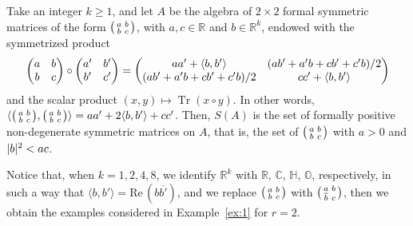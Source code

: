 \documentclass[10.5pt,reqno]{amsart}
\DeclareMathOperator{\tr}{Tr}
\DeclarePairedDelimiter{\abs}{\lvert}{\rvert}
\let\originalleft\left
\let\originalright\right
\renewcommand{\left}{\mathopen{}\mathclose\bgroup\originalleft}
\renewcommand{\right}{\aftergroup\egroup\originalright}
\newcommand{\C}{\mathds{C}}
\newcommand{\Hd}{\mathds{H}}
\newcommand{\Od}{\mathds{O}}
\newcommand{\R}{\mathds{R}}
\renewcommand{\Re}{\mathrm{Re}\,}
\newcommand{\Meg}{\geqslant}
\begin{document}
\begin{ex}\label{ex:2}
	Take an integer $k \Meg 1$, and let $A$ be the algebra of $2\times 2$ formal symmetric matrices of the form $\left(\begin{smallmatrix} a & b\\ b & c \end{smallmatrix}\right)$, with $a,c\in \R$ and $b\in \R^{k}$, endowed with the symmetrized product 
	\[
	\left(\begin{matrix} a & b\\ b & c \end{matrix}\right)\circ \left(\begin{matrix} a' & b'\\ b' & c' \end{matrix}\right)=\left(\begin{matrix} a a'+ \langle b,b'\rangle & (a b'+a'b+cb'+c' b)/2\\ (a b'+a'b+cb'+c' b)/2 & cc'+\langle b,b'\rangle \end{matrix}\right)
	\]
	and the scalar product $(x,y)\mapsto \tr(x\circ y) $. In other words, $\langle \left(\begin{smallmatrix} a & b\\ b & c \end{smallmatrix}\right), \left(\begin{smallmatrix} a & b\\ b & c \end{smallmatrix}\right)\rangle= a a'+2 \langle b,b'\rangle+c c'$. Then, $S(A)$ is the set of formally positive non-degenerate symmetric matrices on $A$, that is, the set of $\left(\begin{smallmatrix} a & b\\ b & c \end{smallmatrix}\right)$ with $a>0$ and $\abs{b}^2< ac$. 
	
	Notice that, when $k=1,2,4,8$, we identify $\R^k$ with $\R$, $\C$, $\Hd$, $\Od$, respectively, in such a way that $\langle b, b'\rangle=\Re (b\overline{b'})$, and we replace $  \left(\begin{smallmatrix} a & b\\ b & c \end{smallmatrix}\right)$ with $  \left(\begin{smallmatrix} a & b\\ \overline b & c \end{smallmatrix}\right)$, then we obtain the examples considered in Example~\ref{ex:1} for $r=2$.
\end{ex}
\end{document}

